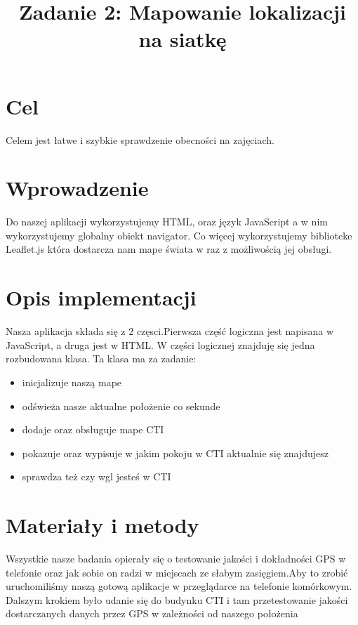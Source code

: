 \documentclass{classrep}
\author{
  \studentinfo{Trung Anh Nguyen Nang}{236613} \and
  \studentinfo{Tomasz Makowski}{236593}
}
\title{Zadanie 2: Mapowanie lokalizacji na siatkę}
\begin{document}
\maketitle



\section{Cel}
{Celem jest łatwe i szybkie sprawdzenie obecności na zajęciach.}

\section{Wprowadzenie}
{Do naszej aplikacji wykorzystujemy HTML, oraz język JavaScript a w nim wykorzystujemy globalny obiekt navigator. Co więcej wykorzystujemy biblioteke Leaflet.js która dostarcza nam mape świata w raz z możliwością jej obsługi.}

\section{Opis implementacji}
{Nasza aplikacja składa się z 2 częsci.Pierwsza część logiczna jest napisana w JavaScript, a druga jest w HTML. W części logicznej znajduję się jedna rozbudowana klasa.
Ta klasa ma za zadanie: 
\begin{itemize}
\item inicjalizuje naszą mape
\item odświeża nasze aktualne położenie co sekunde
\item dodaje oraz obsługuje mape CTI
\item pokazuje oraz wypisuje w jakim pokoju w CTI aktualnie się znajdujesz
\item sprawdza też czy wgl jesteś w CTI
\end{itemize}}

\section{Materiały i metody}
{Wszystkie nasze badania opierały się o testowanie jakości i dokładności GPS w telefonie oraz jak sobie on radzi w miejscach ze słabym zasięgiem.Aby to zrobić uruchomiliśmy naszą gotową aplikacje w przeglądarce na telefonie komórkowym. Dalszym krokiem było udanie się do budynku CTI i tam przetestowanie jakości dostarczanych danych przez GPS w zależności od naszego położenia}
\end{document}

